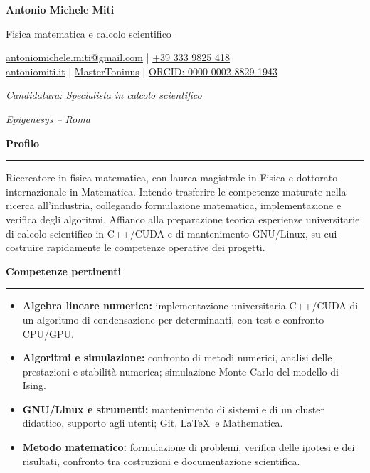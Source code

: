 \documentclass[10pt,a4paper]{article}
\newcommand{\cvsection}[1]{%
    \Needspace{4\baselineskip}%
    \vspace{0.8em}%
    {\large\bfseries\color{accent} #1}\par
    \vspace{0.2em}\hrule\vspace{0.45em}%
}
\begin{document}
{\Huge\bfseries Antonio Michele Miti}\par
\vspace{0.25em}
{\large\color{accent} Fisica matematica e calcolo scientifico}\par
    \vspace{0.1em}
    \begin{center}
        \href{mailto:antoniomichele.miti@gmail.com}{%
                \faEnvelope\enspace antoniomichele.miti@gmail.com}  |
        \href{tel:+393339825418}{\faPhone\enspace +39 333 9825 418} \\[3pt]
        \href{https://www.antoniomiti.it/}{\faGlobe\enspace antoniomiti.it} |
        \href{https://github.com/MasterToninus}{\faGithub\enspace MasterToninus} |
        \href{https://orcid.org/0000-0002-8829-1943}{%
            \faOrcid\enspace ORCID: 0000-0002-8829-1943}
    \end{center}
    \vspace{0.1em}
\textit{Candidatura: Specialista in calcolo scientifico}\par
\textit{Epigenesys -- Roma}\par




\cvsection{Profilo}
{Ricercatore in fisica matematica, con laurea magistrale in Fisica e dottorato internazionale in Matematica. Intendo trasferire le competenze maturate nella ricerca all'industria, collegando formulazione matematica, implementazione e verifica degli algoritmi. Affianco alla preparazione teorica esperienze universitarie di calcolo scientifico in C++/CUDA e di mantenimento GNU/Linux, su cui costruire rapidamente le competenze operative dei progetti.}

\cvsection{Competenze pertinenti}
\begin{itemize}
    \item {\textbf{Algebra lineare numerica:} implementazione universitaria C++/CUDA di un algoritmo di condensazione per determinanti, con test e confronto CPU/GPU.}
    \item {\textbf{Algoritmi e simulazione:} confronto di metodi numerici, analisi delle prestazioni e stabilità numerica; simulazione Monte Carlo del modello di Ising.}
    \item {\textbf{GNU/Linux e strumenti:} mantenimento di sistemi e di un cluster didattico, supporto agli utenti; Git, \LaTeX\ e Mathematica.}
    \item {\textbf{Metodo matematico:} formulazione di problemi, verifica delle ipotesi e dei risultati, confronto tra costruzioni e documentazione scientifica.}
\end{itemize}
\end{document}
